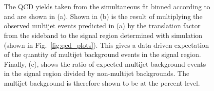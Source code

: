 \begin{figure}[!h]
  \centering
   ~
   \\
   \\
  \caption{
    The QCD yields taken from the simultaneous fit binned according to \njet and \scalht are shown in (a).
    Shown in (b) is the result of multiplying the observed multijet events predicted
    in (a) by the translation factor from the sideband to the signal
    region determined with simulation (shown in
    Fig.~\ref{fig:qcd_plots}). This gives a data driven expectation of
    the quantity of multijet background events in the signal region. 
    Finally, (c), shows the ratio of expected
    multijet background events in the signal region divided by
    non-multijet backgrounds. The multijet background is therefore
    shown to be at the percent level.}
  \label{fig:qcd_plots2}
\end{figure}

